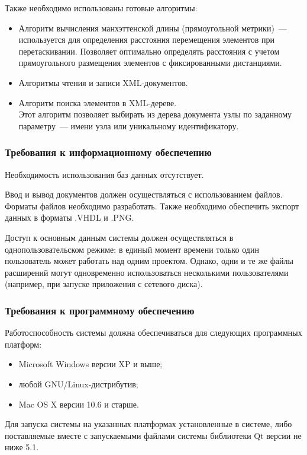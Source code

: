 Также необходимо использованы готовые алгоритмы:
\begin{itemize}
  \item Алгоритм вычисления манхэттенской длины (прямоугольной метрики)~--- используется для определения расстояния перемещения элементов при перетаскивании. Позволяет оптимально определять расстояния с учетом прямоугольного размещения элементов с фиксированными дистанциями.
  \item Алгоритмы чтения и записи XML-документов.
  \item Алгоритм поиска элементов в XML-дереве.\\
  Этот алгоритм позволяет выбирать из дерева документа узлы по заданному параметру~--- имени узла или уникальному идентификатору.
\end{itemize}
%
%
\subsubsection{Требования к информационному обеспечению} \label{sec:ware:info}
Необходимость использования баз данных отсутствует.

Ввод и вывод документов должен осуществляться с использованием файлов.
Форматы файлов необходимо разработать.
Также необходимо обеспечить экспорт данных в форматы .VHDL и .PNG.

Доступ к основным данным системы должен осуществляться в однопользовательском режиме: в единый момент времени только один пользователь может работать над одним проектом.
Однако, одни и те же файлы расширений могут одновременно использоваться несколькими пользователями (например, при запуске приложения с сетевого диска).

%
%
\subsubsection{Требования к программному обеспечению} \label{sec:ware:soft}
Работоспособность системы должна обеспечиваться для следующих программных платформ:
\begin{itemize}
  \item Microsoft Windows версии XP и выше;
  \item любой GNU/Linux-дистрибутив;
  \item Mac OS X версии 10.6 и старше.
\end{itemize}
Для запуска системы на указанных платформах установленные в системе, либо поставляемые вместе с запускаемыми файлами системы библиотеки Qt версии не ниже 5.1.

